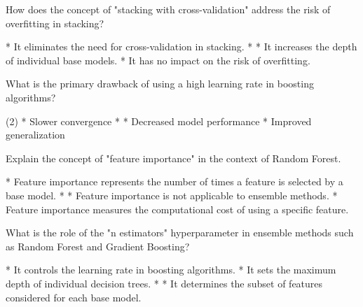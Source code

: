 \documentclass[11pt]{extarticle}
\begin{document}
\begin{exercise}
    How does the concept of "stacking with cross-validation" address the risk of overfitting in stacking?
    \begin{choice}
        * It eliminates the need for cross-validation in stacking.
        * 
        * It increases the depth of individual base models.
        * It has no impact on the risk of overfitting.
    \end{choice}
\end{exercise}
\begin{solution}
\end{solution}

\begin{exercise}
    What is the primary drawback of using a high learning rate in boosting algorithms?
    \begin{choice}(2)
        * Slower convergence
        * 
        * Decreased model performance
        * Improved generalization
    \end{choice}
\end{exercise}
\begin{solution}
\end{solution}

\begin{exercise}
    Explain the concept of "feature importance" in the context of Random Forest.
    \begin{choice}
        * Feature importance represents the number of times a feature is selected by a base model.
        * 
        * Feature importance is not applicable to ensemble methods.
        * Feature importance measures the computational cost of using a specific feature.
    \end{choice}
\end{exercise}
\begin{solution}
\end{solution}

\begin{exercise}
    What is the role of the "n estimators" hyperparameter in ensemble methods such as Random Forest and Gradient Boosting?
    \begin{choice}
        * It controls the learning rate in boosting algorithms.
        * It sets the maximum depth of individual decision trees.
        * 
        * It determines the subset of features considered for each base model.
    \end{choice}
\end{exercise}
\begin{solution}
\end{solution}
\end{document}
